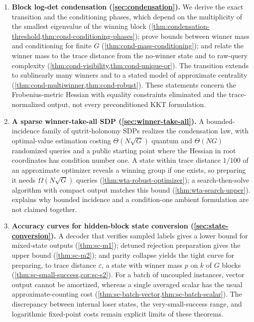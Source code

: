 \begin{enumerate}[leftmargin=*]
 \item \textbf{Block log-det condensation
 (\cref{sec:condensation}).}  We derive the exact transition and the
 conditioning phases, which depend on the multiplicity of the smallest
 eigenvalue of the winning block
 (\cref{thm:condensation-threshold,thm:cond-conditioning-phases}); prove
 bounds between winner mass and conditioning for finite \(G\)
 (\cref{thm:cond-mass-conditioning}); and relate the winner mass to the trace
 distance from the no-winner state and to raw-query complexity
 (\cref{thm:cond-visibility,thm:cond-unique-or}).  The transition extends to
 sublinearly many winners and to a stated model of approximate centrality
 (\cref{thm:cond-multiwinner,thm:cond-robust}).  These statements concern the
 Frobenius-metric Hessian with equality constraints eliminated and the
 trace-normalized output, not every preconditioned KKT formulation.

 \item \textbf{A sparse winner-take-all SDP
 (\cref{sec:winner-take-all}).}  A bounded-incidence family of
 qutrit-holonomy SDPs realizes the condensation law, with optimal-value
 estimation costing \(\Theta(N\sqrt G)\) quantum and \(\Theta(NG)\)
 randomized queries and a public starting point where the Hessian in root
 coordinates has condition number one.  A state within trace distance
 \(1/100\) of an approximate optimizer reveals a winning group if one
 exists, so preparing it needs \(\Omega(N\sqrt G)\) queries
 (\cref{thm:wta-robust-optimizer}); a search-then-solve algorithm with compact
 output matches this bound (\cref{thm:wta-search-upper}).
  explains why bounded incidence and a condition-one
 ambient formulation are not claimed together.

 \item \textbf{Accuracy curves for hidden-block state conversion
 (\cref{sec:state-conversion}).}  A decoder that verifies sampled labels
 gives a lower bound for mixed-state outputs (\cref{thm:sc-m1}); detuned
 rejection preparation gives the upper bound (\cref{thm:sc-m2}); and parity
 collapse yields the tight curve for preparing, to trace distance
 \(\varepsilon\), a state with winner mass \(p\) on \(k\) of \(G\) blocks
 (\cref{thm:sc-small-success,cor:sc-s2}).  For a batch of uncoupled
 instances, vector output cannot be amortized, whereas a single averaged
 scalar has the usual approximate-counting cost
 (\cref{thm:sc-batch-vector,thm:sc-batch-scalar}).  The discrepancy between
 internal loser states, the very-small-success range, and logarithmic
 fixed-point costs remain explicit limits of these theorems.


\end{enumerate}
